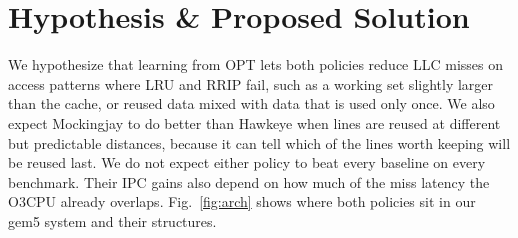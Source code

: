 \documentclass[10pt,journal,compsoc]{IEEEtran}
\begin{document}
\section{Hypothesis \& Proposed Solution}

We hypothesize that learning from OPT lets both policies reduce LLC misses on
access patterns where LRU and RRIP fail, such as a working set slightly larger
than the cache, or reused data mixed with data that is used only once. We also
expect Mockingjay to do better than Hawkeye when lines are reused at different
but predictable distances, because it can tell which of the lines worth keeping
will be reused last. We do not expect either policy to beat every baseline on
every benchmark. Their IPC gains also depend on how much of the miss latency the
O3CPU already overlaps. Fig.~\ref{fig:arch} shows where both policies sit in our
gem5 system and their structures.
\end{document}
